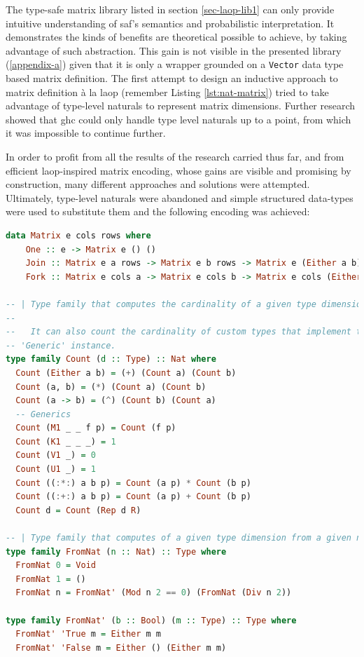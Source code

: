 \documentclass[
  oneside,
  11pt, a4paper,
  footinclude=true,
  headinclude=true,
  cleardoublepage=empty
]{scrbook}
\theoremstyle{definition}
\theoremstyle{definition}
\begin{document}
        The type-safe matrix library listed in section \ref{sec-laop-lib1} can only provide intuitive understanding of \gls{saf}'s semantics and probabilistic interpretation. It demonstrates the kinds of benefits are theoretical possible to achieve, by taking advantage of such abstraction. This gain is not visible in the presented library (\ref{appendix-a}) given that it is only a wrapper grounded on a \texttt{Vector} data type based matrix definition. The first attempt to design an inductive approach to matrix definition à la \gls{laop} (remember Listing \ref{lst:nat-matrix}) tried to take advantage of type-level naturals to represent matrix dimensions. Further research showed that \gls{ghc} could only handle type level naturals up to a point, from which it was impossible to continue further.
	    
	    In order to profit from all the results of the research carried thus far, and from efficient \gls{laop}-inspired matrix encoding, whose gains are visible and promising by construction, many different approaches and solutions were attempted. Ultimately, type-level naturals were abandoned and simple structured data-types were used to substitute them and the following encoding was achieved:
	    
        \begin{lstlisting}[language=Haskell,label={lst:type-fam}, caption={Inductive Matrix definition},captionpos=b]
data Matrix e cols rows where
    One :: e -> Matrix e () ()
    Join :: Matrix e a rows -> Matrix e b rows -> Matrix e (Either a b) rows
    Fork :: Matrix e cols a -> Matrix e cols b -> Matrix e cols (Either a b)

-- | Type family that computes the cardinality of a given type dimension.
--
--   It can also count the cardinality of custom types that implement the
-- 'Generic' instance.
type family Count (d :: Type) :: Nat where
  Count (Either a b) = (+) (Count a) (Count b)
  Count (a, b) = (*) (Count a) (Count b)
  Count (a -> b) = (^) (Count b) (Count a)
  -- Generics
  Count (M1 _ _ f p) = Count (f p)
  Count (K1 _ _ _) = 1
  Count (V1 _) = 0
  Count (U1 _) = 1
  Count ((:*:) a b p) = Count (a p) * Count (b p)
  Count ((:+:) a b p) = Count (a p) + Count (b p)
  Count d = Count (Rep d R)

-- | Type family that computes of a given type dimension from a given natural
type family FromNat (n :: Nat) :: Type where
  FromNat 0 = Void
  FromNat 1 = ()
  FromNat n = FromNat' (Mod n 2 == 0) (FromNat (Div n 2))

type family FromNat' (b :: Bool) (m :: Type) :: Type where
  FromNat' 'True m = Either m m
  FromNat' 'False m = Either () (Either m m)
        \end{lstlisting}{}
	    
\end{document}
